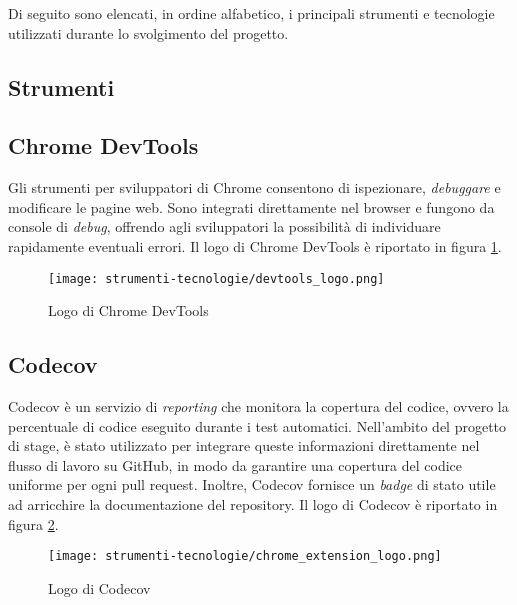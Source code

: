 \par Di seguito sono elencati, in ordine alfabetico, i principali strumenti e tecnologie utilizzati durante lo svolgimento del progetto.

\subsection{Strumenti}

\subsection*{Chrome DevTools}

\par Gli strumenti per sviluppatori di Chrome consentono di ispezionare, \textit{debuggare} e modificare le pagine web. Sono integrati direttamente nel browser e fungono da console di \textit{debug}, offrendo agli sviluppatori la possibilità di individuare rapidamente eventuali errori. Il logo di Chrome DevTools è riportato in figura \ref{fig:logo_chrome_devtools}.

\begin{figure}[H]
  \centering 
  \texttt{[image: strumenti-tecnologie/devtools\_logo.png]} 
  \caption{Logo di Chrome DevTools}
  \label{fig:logo_chrome_devtools}
\end{figure}

\subsection*{Codecov}

\par Codecov è un servizio di \textit{reporting} che monitora la copertura del codice, ovvero la percentuale di codice eseguito durante i test automatici. Nell’ambito del progetto di stage, è stato utilizzato per integrare queste informazioni direttamente nel flusso di lavoro su GitHub, in modo da garantire una copertura del codice uniforme per ogni \gls{pull request}. Inoltre, Codecov fornisce un \textit{badge} di stato utile ad arricchire la documentazione del \gls{repository}. Il logo di Codecov è riportato in figura \ref{fig:logo_codecov}.

\begin{figure}[H]
  \centering 
  \texttt{[image: strumenti-tecnologie/chrome\_extension\_logo.png]} 
  \caption{Logo di Codecov}
  \label{fig:logo_codecov}
\end{figure}


